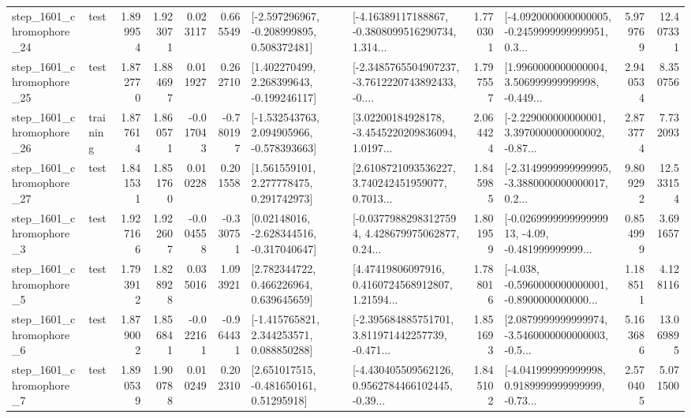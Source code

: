 \begin{tabular}{llrrrrllrlrr}
 step\_1601\_chromophore\_24 &      test &      1.899954 &    1.923071 &      0.023117 &  0.665549 &   [-2.597296967, -0.208999895, 0.508372481] &  [-4.16389117188867, -0.3808099516290734, 1.314... &       1.770301 &  [-4.0920000000000005, -0.2459999999999951, 0.3... &            5.979769 &         12.407331 \\
 step\_1601\_chromophore\_25 &      test &      1.872770 &    1.884697 &      0.011927 &  0.262710 &    [1.402270499, 2.268399643, -0.199246117] &  [-2.3485765504907237, -3.7612220743892433, -0.... &       1.797557 &  [1.9960000000000004, 3.506999999999998, -0.449... &            2.940534 &          8.350756 \\
 step\_1601\_chromophore\_26 &  training &      1.877614 &    1.860571 &     -0.017043 & -0.780197 &   [-1.532543763, 2.094905966, -0.578393663] &  [3.02200184928178, -3.4545220209836094, 1.0197... &       2.064424 &  [-2.229000000000001, 3.3970000000000002, -0.87... &            2.873774 &          7.732093 \\
 step\_1601\_chromophore\_27 &      test &      1.841531 &    1.851760 &      0.010228 &  0.201558 &     [1.561559101, 2.277778475, 0.291742973] &  [2.6108721093536227, 3.740242451959077, 0.7013... &       1.845985 &  [-2.3149999999999995, -3.3880000000000017, 0.2... &            9.809292 &         12.533154 \\
  step\_1601\_chromophore\_3 &      test &      1.927166 &    1.922607 &     -0.004558 & -0.330751 &    [0.02148016, -2.628344516, -0.317040647] &  [-0.03779882983127594, 4.428679975062877, 0.24... &       1.801959 &  [-0.026999999999999913, -4.09, -0.481999999999... &            0.854999 &          3.691657 \\
  step\_1601\_chromophore\_5 &      test &      1.793912 &    1.828928 &      0.035016 &  1.093921 &     [2.782344722, 0.466226964, 0.639645659] &  [4.47419806097916, 0.4160724568912807, 1.21594... &       1.788016 &  [-4.038, -0.5960000000000001, -0.8900000000000... &            1.188511 &          4.128116 \\
  step\_1601\_chromophore\_6 &      test &      1.879002 &    1.856841 &     -0.022161 & -0.964431 &    [-1.415765821, 2.344253571, 0.088850288] &  [-2.395684885751701, 3.811971442257739, -0.471... &       1.851693 &  [2.0879999999999974, -3.5460000000000003, -0.5... &            5.163686 &         13.069895 \\
  step\_1601\_chromophore\_7 &      test &      1.890539 &    1.900788 &      0.010249 &  0.202310 &     [2.651017515, -0.481650161, 0.51295918] &  [-4.430405509562126, 0.9562784466102445, -0.39... &       1.845102 &  [-4.041999999999998, 0.9189999999999999, -0.73... &            2.570405 &          5.071500 \\

\end{tabular}
